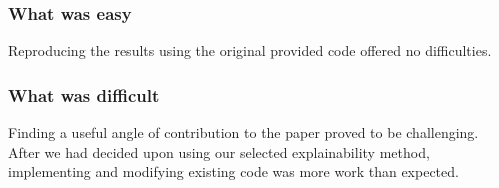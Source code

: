 {\subsubsection*{What was easy}
Reproducing the results using the original provided code offered no difficulties.

\subsubsection*{What was difficult}
Finding a useful angle of contribution to the paper proved to be challenging. After we had decided upon using our selected explainability method, implementing and modifying existing code was more work than expected.
}
\def \replicationCITE{}
\def \replicationBIB{}
\def \replicationURL{}
\def \replicationDOI{}
\def \contactNAME{}
\def \contactEMAIL{}
\def \articleKEYWORDS{rescience c, rescience x}
\def \journalNAME{ReScience C}
\def \journalVOLUME{9}
\def \journalISSUE{2}
\def \articleNUMBER{}
\def \articleDOI{}
\def \authorsFULL{Anonymous Authors}
\def \authorsABBRV{Anonymous}
\def \authorsSHORT{Anonymous}
\title{\articleTITLE}
\date{}
\author[1,\orcid{0000-0000-0000-0000}]{Anonymous}

